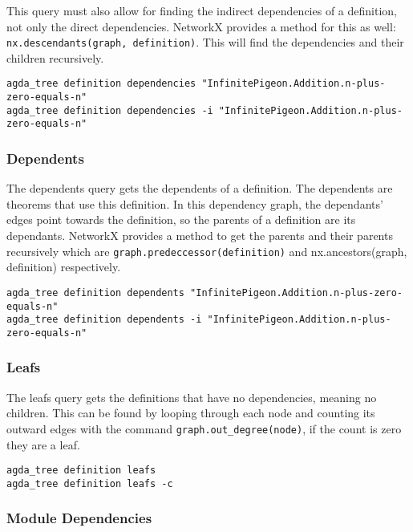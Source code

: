This query must also allow for finding the indirect dependencies of a
definition, not only the direct dependencies. NetworkX provides a method for
this as well: \texttt{nx.descendants(graph, definition)}. This will find the
dependencies and their children recursively.

\begin{lstlisting}
agda_tree definition dependencies "InfinitePigeon.Addition.n-plus-zero-equals-n"
agda_tree definition dependencies -i "InfinitePigeon.Addition.n-plus-zero-equals-n"
\end{lstlisting}

\subsubsection{Dependents}

The dependents query gets the dependents of a definition. The dependents are
theorems that use this definition. In this dependency graph, the dependants'
edges point towards the definition, so the parents of a definition are its
dependants. NetworkX provides a method to get the parents and their parents
recursively which are \texttt{graph.predeccessor(definition)} and
\textsf{nx.ancestors(graph, definition)} respectively.

\begin{lstlisting}
agda_tree definition dependents "InfinitePigeon.Addition.n-plus-zero-equals-n"
agda_tree definition dependents -i "InfinitePigeon.Addition.n-plus-zero-equals-n"
\end{lstlisting}

\subsubsection{Leafs}

The leafs query gets the definitions that have no dependencies, meaning no
children. This can be found by looping through each node and counting its
outward edges with the command \texttt{graph.out\_degree(node)}, if the count
is zero they are a leaf.

\begin{lstlisting}
agda_tree definition leafs
agda_tree definition leafs -c
\end{lstlisting}

\subsubsection{Module Dependencies}

